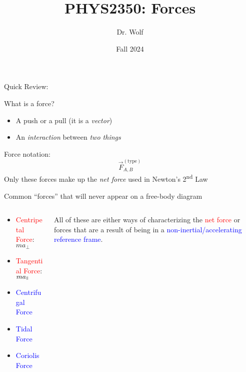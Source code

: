 \documentclass{beamer}
\title{PHYS2350: Forces}
\author{Dr. Wolf}
\date{Fall 2024}
\newcommand*{\paral}{\stretchrel*{\parallel}{\perp}}
\begin{document}
\begin{frame}
  \titlepage
\end{frame}

\begin{frame}
  {Quick Review:}
  \begin{block}{What is a force?}
    \begin{itemize}
      \item A push or a pull (it is a \textit{vector})
      \item An \textit{interaction} between \textit{two things}
    \end{itemize}
    Force notation:
    \[
      \vec{F}^{(\text{type})}_{A,B}
    \]
    Only these forces make up the \textit{net force} used in Newton's 2\textsuperscript{nd} Law
  \end{block}
  Common ``forces'' that will never appear on a free-body diagram
  \begin{columns}
    \begin{column}{0.4\textwidth}
      \begin{itemize}
        \item \textcolor{red}{Centripetal Force}: $ma_{\perp}$
        \item \textcolor{red}{Tangential Force}: $ma_{\paral}$
        \item \textcolor{blue}{Centrifugal Force}
        \item \textcolor{blue}{Tidal Force}
        \item \textcolor{blue}{Coriolis Force}
      \end{itemize}
    \end{column}
    \begin{column}{0.55\textwidth}
      \begin{center}
        \begin{exampleblock}{}
            All of these are either ways of characterizing the \textcolor{red}{net force} or
            forces that are a result of being in a \textcolor{blue}{non-inertial/accelerating
              reference frame}.
        \end{exampleblock}
      \end{center}
    \end{column}
  \end{columns}
\end{frame}
\end{document}
